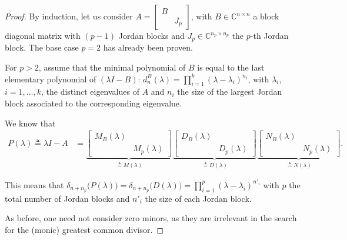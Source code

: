 \documentclass[11pt]{article}
\newcommand{\complex}{\mathbb{C}} %
\begin{document}
\begin{proof}
By induction, let us consider $A=\left[\begin{smallmatrix}
B & \\
 & J_p
\end{smallmatrix}\right]$, with $B \in \complex^{n\times n}$ a block diagonal matrix with $(p-1)$ Jordan blocks and $J_p\in \complex^{n_p\times n_p}$ the \(p\)-th Jordan block.
The base case $p = 2$ has already been proven.

For $p > 2$, assume that the minimal polynomial of $B$ is equal to the last elementary polynomial of $(\lambda I - B)$: $d_{n}^{B}(\lambda) = \prod_{i = 1}^k (\lambda - \lambda_i)^{n_i}$, with $\lambda_i$, $i= 1, \dots, k$, the distinct eigenvalues of \(A\) and $n_i$ the size of the largest Jordan block associated to the corresponding eigenvalue.

We know that
\begin{align*}
P(\lambda)\triangleq\lambda I - A 
&= \underbrace{\begin{bmatrix}
M_{B}(\lambda) & \\
& M_{p}(\lambda)
\end{bmatrix}}_{\triangleq M(\lambda)}\underbrace{\begin{bmatrix}
D_{B}(\lambda) & \\
& D_{p}(\lambda)
\end{bmatrix}}_{\triangleq D(\lambda)}\underbrace{\begin{bmatrix}
N_{B}(\lambda) & \\
& N_{p}(\lambda)
\end{bmatrix}}_{\triangleq N(\lambda)}.
\end{align*}

This means that $\delta_{n+n_p}\big(P(\lambda)\big) = \delta_{n+n_p}\big(D(\lambda)\big) = \prod_{i = 1}^p (\lambda - \lambda_i)^{n'_i}$ with $p$ the total number of Jordan blocks and $n'_i$ the size of each Jordan block.

As before, one need not consider zero minors, as they are irrelevant in the search for the (monic) greatest common divisor.


\end{proof}
\end{document}
